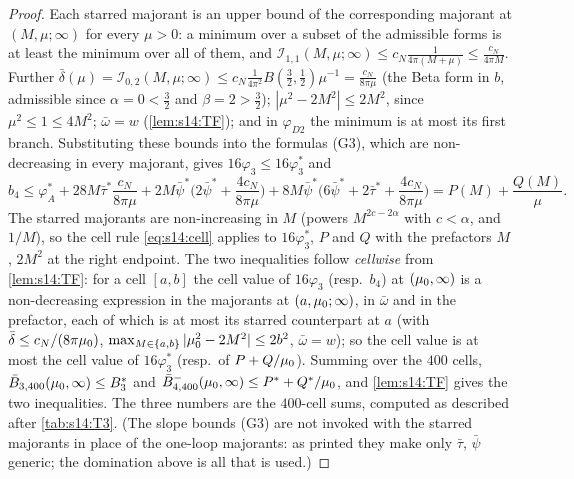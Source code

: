 \begin{proof}
Each starred majorant is an upper bound of the corresponding majorant at $(M,\mu;\infty)$ for every $\mu>0$: a minimum over a subset of the admissible forms is at least the minimum over all of them, and $\mathcal I_{1,1}(M,\mu;\infty)\le c_N\frac1{4\pi(M+\mu)}\le\frac{c_N}{4\pi M}$. Further $\bar\delta(\mu)=\mathcal I_{0,2}(M,\mu;\infty)\le c_N\frac1{4\pi^2}B(\frac32,\frac12)\mu^{-1}=\frac{c_N}{8\pi\mu}$ (the Beta form in $b$, admissible since $\alpha=0<\frac32$ and $\beta=2>\frac32$); $|\mu^2-2M^2|\le2M^2$, since $\mu^2\le1\le4M^2$; $\bar\omega=w$ (\cref{lem:s14:TF}); and in $\varphi_{D2}$ the minimum is at most its first branch. Substituting these bounds into the formulas (G3), which are non-decreasing in every majorant, gives $16\varphi_3\le16\varphi_3^*$ and
\[
b_4\le\varphi_A^*+28M\bar\tau^*\frac{c_N}{8\pi\mu}+2M\bar\psi^*\Big(2\bar\psi^*+\frac{4c_N}{8\pi\mu}\Big)+8M\bar\psi^*\Big(6\bar\psi^*+2\bar\tau^*+\frac{4c_N}{8\pi\mu}\Big)=P(M)+\frac{Q(M)}\mu .
\]
The starred majorants are non-increasing in $M$ (powers $M^{2c-2\alpha}$ with $c<\alpha$, and $1/M$), so the cell rule \eqref{eq:s14:cell} applies to $16\varphi_3^*$, $P$ and $Q$ with the prefactors $M$, $2M^2$ at the right endpoint. The two inequalities follow \emph{cellwise} from \cref{lem:s14:TF}: for a cell $[a,b]$ the cell value of $16\varphi_3$ (resp.\ $b_4$) at $(\mu_0,\infty)$ is a non-decreasing expression in the majorants at $(a,\mu_0;\infty)$, in $\bar\omega$ and in the prefactor, each of which is at most its starred counterpart at $a$ (with $\bar\delta\le c_N/(8\pi\mu_0)$, $\max_{M\in\{a,b\}}|\mu_0^2-2M^2|\le2b^2$, $\bar\omega=w$); so the cell value is at most the cell value of $16\varphi_3^*$ (resp.\ of $P+Q/\mu_0$). Summing over the $400$ cells, $\bar B_{3,400}(\mu_0,\infty)\le B_3^*$ and $\bar B^-_{4,400}(\mu_0,\infty)\le P^*+Q^*/\mu_0$, and \cref{lem:s14:TF} gives the two inequalities. The three numbers are the $400$-cell sums, computed as described after \cref{tab:s14:T3}. (The slope bounds (G3) are not invoked with the starred majorants in place of the one-loop majorants: as printed they make only $\bar\tau$, $\bar\psi$ generic; the domination above is all that is used.)
\end{proof}
